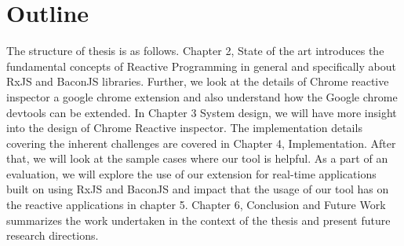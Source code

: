 \section{Outline}

The structure of thesis is as follows. Chapter 2, State of the art introduces the fundamental concepts of Reactive Programming in general and specifically about RxJS and BaconJS libraries. 
Further, we look at the details of Chrome reactive inspector a google chrome extension and also understand how the Google chrome devtools can be extended. In Chapter 3 System design, we will have more insight into the design of Chrome Reactive inspector. 
The implementation details covering the inherent challenges are covered in Chapter 4, Implementation. 
After that, we will look at the sample cases where our tool is helpful. 
As a part of an evaluation, we will explore the use of our extension for real-time applications built on using RxJS and BaconJS and impact that the usage of our tool has on the reactive applications in chapter 5. 
Chapter 6, Conclusion and Future Work summarizes the work undertaken in the context of the thesis and present future research directions.


